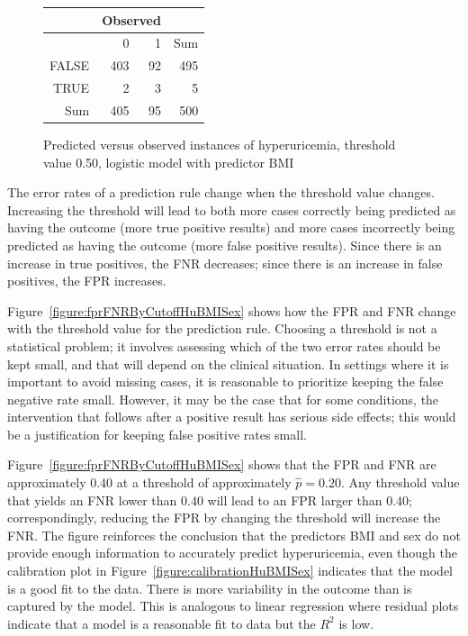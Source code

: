 \begin{figure}[ht]
\centering
\begin{tabular}{rrrr}
  \hline
  & \multicolumn{2}{c}{Observed} & \\
  \hline
 & 0 & 1 & Sum \\ 
  \hline
FALSE & 403 & 92 & 495 \\ 
  TRUE & 2 & 3 & 5 \\ 
  Sum & 405 & 95 & 500 \\ 
   \hline
\end{tabular}
\caption{Predicted versus observed instances of hyperuricemia,
       threshold value 0.50, logistic model with predictor BMI} 
\label{figure:predVsObsHuBMI}
\end{figure}

The error rates of a prediction rule change when the threshold value changes. Increasing the threshold will lead to both more cases correctly being predicted as having the outcome (more true positive results) and more cases incorrectly being predicted as having the outcome (more false positive results). Since there is an increase in true positives, the FNR decreases; since there is an increase in false positives, the FPR increases.


Figure~\ref{figure:fprFNRByCutoffHuBMISex} shows how the FPR and FNR change with the threshold value for the prediction rule.  Choosing a threshold is not a statistical problem; it involves assessing which of the two error rates should be kept small, and that will depend on the clinical situation. In settings where it is important to avoid missing cases, it is reasonable to prioritize keeping the false negative rate small. However, it may be the case that for some conditions, the intervention that follows after a positive result has serious side effects; this would be a justification for keeping false positive rates small.

Figure~\ref{figure:fprFNRByCutoffHuBMISex} shows that the FPR and FNR are approximately $0.40$ at a threshold of approximately $\hat{p} = 0.20$.  Any threshold value that yields an FNR lower than $0.40$ will lead to an FPR larger than $0.40$;  correspondingly, reducing the FPR by changing the threshold will increase the FNR. The figure reinforces the conclusion that the predictors BMI and sex do not provide enough information to accurately predict hyperuricemia, even though the calibration plot in Figure~\ref{figure:calibrationHuBMISex} indicates that the model is a good fit to the data.  There is more variability in the outcome than is captured by the model.  This is analogous to linear regression where residual plots indicate that a model is a reasonable fit to data but the $R^2$ is low.

